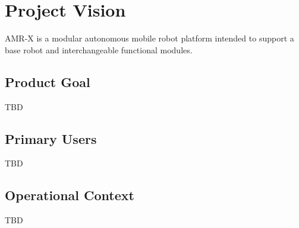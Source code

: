 \chapter{Project Vision}

AMR-X is a modular autonomous mobile robot platform intended to support a base robot and interchangeable functional modules.

\section{Product Goal}

TBD

\section{Primary Users}

TBD

\section{Operational Context}

TBD
